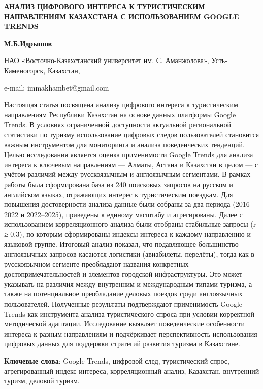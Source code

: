 \begin{articleheader}
{\bfseries АНАЛИЗ ЦИФРОВОГО ИНТЕРЕСА К ТУРИСТИЧЕСКИМ НАПРАВЛЕНИЯМ КАЗАХСТАНА С ИСПОЛЬЗОВАНИЕМ GOOGLE TRENDS}

{\bfseries М.Б.Идрышов}
\end{articleheader}

\begin{affiliation}
НАО «Восточно-Казахстанский университет им. С. Аманжолова», Усть-Каменогорск, Казахстан,

e-mail: immakhambet@gmail.com
\end{affiliation}

Настоящая статья посвящена анализу цифрового интереса к туристическим
направлениям Республики Казахстан на основе данных платформы Google
Trends. В условиях ограниченной доступности актуальной региональной
статистики по туризму использование цифровых следов пользователей
становится важным инструментом для мониторинга и анализа поведенческих
тенденций. Целью исследования является оценка применимости Google Trends
для анализа интереса к ключевым направлениям --- Алматы, Астана и
Казахстан в целом --- с учётом различий между русскоязычным и
англоязычным сегментами. В рамках работы была сформирована база из 240
поисковых запросов на русском и английском языках, отражающих интерес к
туристическим поездкам. Для повышения достоверности анализа данные были
собраны за два периода (2016--2022 и 2022--2025), приведены к единому
масштабу и агрегированы. Далее с использованием корреляционного анализа
были отобраны стабильные запросы (r ≥ 0.3), по которым сформированы
индексы интереса к каждому направлению и языковой группе. Итоговый
анализ показал, что подавляющее большинство англоязычных запросов
касаются логистики (авиабилеты, перелёты), тогда как в русскоязычном
сегменте преобладают названия конкретных достопримечательностей и
элементов городской инфраструктуры. Это может указывать на различия
между внутренним и международным типами туризма, а также на
потенциальное преобладание деловых поездок среди англоязычных
пользователей. Полученные результаты подтверждают применимость Google
Trends как инструмента анализа туристического спроса при условии
корректной методической адаптации. Исследование выявляет поведенческие
особенности интереса к разным направлениям и подчёркивает
перспективность использования цифровых данных для поддержки стратегий
развития туризма в Казахстане.

{\bfseries Ключевые слова}: Google Trends, цифровой след, туристический
спрос, агрегированный индекс интереса, корреляционный анализ, Казахстан,
внутренний туризм, деловой туризм.

